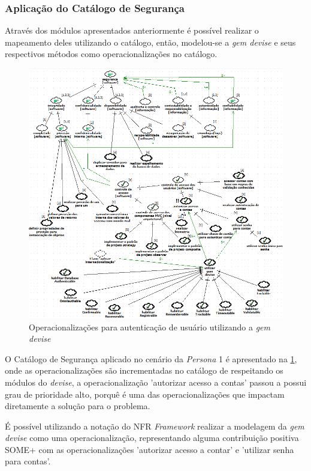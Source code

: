 \subsubsection{Aplicação do Catálogo de Segurança}

Através dos módulos apresentados anteriormente é possível realizar o mapeamento deles utilizando o catálogo, então, modelou-se a \textit{gem devise} e seus respectivos métodos como operacionalizações no catálogo. 


\begin{figure}[h!]
	\centering
	\includegraphics[keepaspectratio=true,scale=0.7]{figuras/catalogoPersona1.PNG}
	\caption{Operacionalizações para autenticação de usuário utilizando a \textit{gem devise}}
	\label{catalogoPersona1}
\end{figure}


O Catálogo de Segurança aplicado no cenário da \textit{Persona} 1 é apresentado na \ref{catalogoPersona1}, onde as operacionalizações são incrementadas no catálogo de respeitando os módulos do \textit{devise}, a operacionalização 'autorizar acesso a contas' passou a possui grau de prioridade alto, porquê é uma das operacionalizações que impactam diretamente a solução para o problema. 

É possível utilizando a notação do NFR \textit{Framework} realizar a modelagem da \textit{gem devise} como uma operacionalização, representando alguma contribuição positiva SOME+ com as operacionalizações 'autorizar acesso a contar' e 'utilizar senha para contas'.
 

